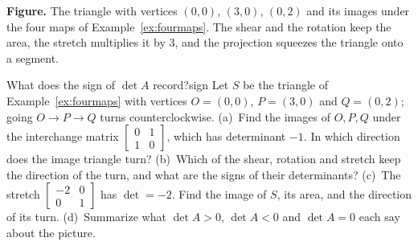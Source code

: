 \documentclass[11pt]{article}
\begin{document}
\begin{center}
\end{center}

\textbf{Figure.} The triangle with vertices $(0,0)$, $(3,0)$, $(0,2)$ and its images under the four maps of Example~\ref{ex:fourmaps}. The shear and the rotation keep the area, the stretch multiplies it by $3$, and the projection squeezes the triangle onto a segment.

\begin{think}{What does the sign of $\det A$ record?}{sign}
Let $S$ be the triangle of Example~\ref{ex:fourmaps} with vertices $O=(0,0)$, $P=(3,0)$ and $Q=(0,2)$; going $O\to P\to Q$ turns counterclockwise. (a)~Find the images of $O,P,Q$ under the interchange matrix $\begin{bmatrix}0&1\\1&0\end{bmatrix}$, which has determinant $-1$. In which direction does the image triangle turn? (b)~Which of the shear, rotation and stretch keep the direction of the turn, and what are the signs of their determinants? (c)~The stretch $\begin{bmatrix}-2&0\\0&1\end{bmatrix}$ has $\det=-2$. Find the image of $S$, its area, and the direction of its turn. (d)~Summarize what $\det A>0$, $\det A<0$ and $\det A=0$ each say about the picture.
\end{think}
\end{document}

